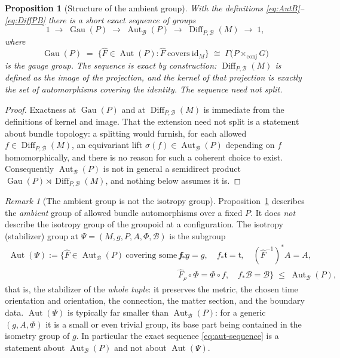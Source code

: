\documentclass[11pt,a4paper]{article}
\theoremstyle{plain}
\newtheorem{proposition}[theorem]{Proposition}
\theoremstyle{definition}
\theoremstyle{remark}
\newtheorem{remark}[theorem]{Remark}
\newcommand{\Aut}{\operatorname{Aut}}
\newcommand{\AutB}{\operatorname{Aut}_{\mathcal{B}}}
\newcommand{\Gau}{\operatorname{Gau}}
\newcommand{\Diff}{\operatorname{Diff}}
\newcommand{\id}{\mathrm{id}}
\begin{document}
\begin{proposition}[Structure of the ambient group]
\label{prop:aut-sequence}
With the definitions \eqref{eq:AutB}--\eqref{eq:DiffPB} there is a short exact sequence of groups
\begin{equation}
\label{eq:aut-sequence}
1\;\longrightarrow\;\Gau(P)\;\longrightarrow\;\AutB(P)\;\longrightarrow\;
\Diff_{P,\mathcal{B}}(M)\;\longrightarrow\;1 ,
\end{equation}
where
\[
\Gau(P)\;=\;\bigl\{\hat F\in\Aut(P):\hat F\ \text{covers}\ \id_M\bigr\}
\;\cong\;\Gamma\bigl(P\times_{\mathrm{conj}}G\bigr)
\]
is the gauge group. The sequence is exact by construction: $\Diff_{P,\mathcal{B}}(M)$ is
\emph{defined} as the image of the projection, and the kernel of that projection is exactly the
set of automorphisms covering the identity. The sequence need not split.
\end{proposition}

\begin{proof}
Exactness at $\Gau(P)$ and at $\Diff_{P,\mathcal{B}}(M)$ is immediate from the definitions of
kernel and image. That the extension need not split is a statement about bundle topology: a
splitting would furnish, for each allowed $f\in\Diff_{P,\mathcal{B}}(M)$, an equivariant lift
$\sigma(f)\in\AutB(P)$ depending on $f$ homomorphically, and there is no reason for such a
coherent choice to exist. Consequently $\AutB(P)$ is not in general a semidirect product
$\Gau(P)\rtimes\Diff_{P,\mathcal{B}}(M)$, and nothing below assumes it is.
\end{proof}

\begin{remark}[The ambient group is not the isotropy group]
\label{rem:isotropy}
Proposition~\ref{prop:aut-sequence} describes the \emph{ambient} group of allowed bundle
automorphisms over a fixed $P$. It does \emph{not} describe the isotropy group of the groupoid at
a configuration. The isotropy (stabilizer) group at
$\Psi=(M,g,P,A,\Phi,\mathcal{B})$ is the subgroup
\begin{equation}
\label{eq:stabilizer}
\begin{aligned}
\Aut(\Psi)
:=\bigl\{\hat F\in\AutB(P)\ \text{covering some}\ f\ :\ \ 
&f_*g=g,\quad f_*\mathfrak{t}=\mathfrak{t},\quad (\hat F^{-1})^*A=A,\\[-0.15em]
&\hat F_\rho\circ\Phi=\Phi\circ f,\quad f_*\mathcal{B}=\mathcal{B}
\bigr\}\;\le\;\AutB(P),
\end{aligned}
\end{equation}
that is, the stabilizer of the \emph{whole tuple}: it preserves the metric, the chosen time
orientation and orientation, the connection, the matter section, and the boundary data.
$\Aut(\Psi)$ is typically far smaller than $\AutB(P)$: for a generic $(g,A,\Phi)$ it is a small or
even trivial group, its base part being contained in the isometry group of $g$. In particular the
exact sequence \eqref{eq:aut-sequence} is a statement about $\AutB(P)$ and not about
$\Aut(\Psi)$.
\end{remark}
\end{document}
